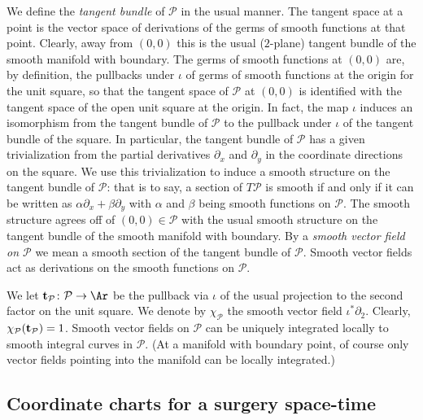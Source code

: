 We define the {\sl tangent bundle} of ${\mathcal P}$ in the usual
manner. The tangent space at a point is the vector space of
derivations of the germs of smooth functions at that point. Clearly,
away from $(0,0)$ this is the usual ($2$-plane) tangent bundle of
the smooth manifold with boundary. The germs of smooth functions at
$(0,0)$ are, by definition,  the pullbacks under $\iota$ of germs
of smooth functions at the origin for the unit square, so that the
tangent space of ${\mathcal P}$ at $(0,0)$ is identified  with the
tangent space of the open unit square at the origin. In fact, the
map $\iota$ induces an isomorphism from the tangent bundle of
${\mathcal P}$ to the pullback under $\iota$ of the tangent bundle
of the square. In particular, the tangent bundle of ${\mathcal P}$
has a given trivialization from the partial derivatives $\partial_x$
and $\partial_y$ in the coordinate directions on the square. We use
this trivialization to induce a smooth structure on the tangent
bundle of ${\mathcal P}$: that is to say, a section of $T{\mathcal
P}$ is smooth if and only if it can be written as $\alpha
\partial_x+\beta
\partial_y$ with $\alpha$ and $\beta $ being smooth functions on
${\mathcal P}$. The smooth structure agrees off of $(0,0)\in
{\mathcal P}$ with the usual smooth structure on the tangent bundle
of the smooth manifold with boundary.
By a {\em smooth vector field on ${\mathcal P}$}  we mean a smooth
section of the tangent bundle of ${\mathcal P}$.
 Smooth vector fields act as derivations on the smooth
functions on ${\mathcal P}$.

 We let ${\bf t}_{\mathcal P}\colon {\mathcal P}\to \Ar$ be the pullback via
$\iota$ of the usual projection to the second factor on the unit
square. We denote by $\chi_{\mathcal P}$ the smooth vector field
$\iota^*\partial_2$. Clearly, $\chi_{\mathcal P}({\bf t}_{\mathcal
P}) =1$. Smooth vector fields on ${\mathcal P}$ can be uniquely
integrated locally to smooth integral curves in ${\mathcal P}$. (At
a manifold with boundary point, of course only vector fields
pointing into the manifold can be locally integrated.)

\subsection{Coordinate charts for a surgery space-time}

